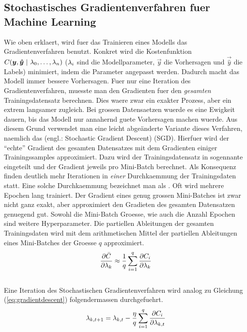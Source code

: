 \subsection{Stochastisches Gradientenverfahren fuer Machine Learning}
Wie oben erklaert, wird fuer das Trainieren eines Modells das Gradientenverfahren benutzt.
Konkret wird die Kostenfunktion $C(\vec{y},\vec{\hat{y}}\ |\ \param_0,\ldots,\param_n)$
($\lambda_i$ sind die Modellparameter, $\vec{y}$ die Vorhersagen und $\vec{\hat{y}}$
die Labels) minimiert, indem die Parameter angepasst werden. Dadurch macht das Modell immer bessere Vorhersagen.
Fuer nur eine Iteration des Gradientenverfahren, muesste man den Gradienten fuer den
\textit{gesamten} Trainingsdatensatz berechnen.
Dies waere zwar ein exakter Prozess, aber ein extrem langsamer zugleich.
Bei grossen Datensaetzen wuerde es eine Ewigkeit dauern, bis das Modell nur annahernd guete Vorhersagen machen wuerde.
\para{}
Aus diesem Grund verwendet man eine leicht abgeänderte Variante dieses
Verfahren, naemlich das  (engl.:
Stochastic Gradient Descent) (SGD).
Hierfuer wird der ``echte'' Gradient des gesamten Datensatzes mit dem Gradienten einiger Trainingssamples approximiert.
Dazu wird der Trainingsdatensatz in sogennante  eingeteilt und der Gradient jeweils pro Mini-Batch berechnet.
Als Konsequenz finden deutlich mehr Iterationen in \textit{einer}
Durchkaemmung der Trainingsdaten statt. Eine solche Durchkaemmung bezeichnet man als
. Oft wird mehrere Epochen lang trainiert.
Der Gradient eines genug grossen Mini-Batches ist zwar nicht ganz exakt, aber approximiert den Gradieten des gesamten Datensatzen genuegend gut.
Sowohl die Mini-Batch Groesse, wie auch die Anzahl Epochen sind weitere Hyperparameter.
\para{}
Die partiellen Ableitungen der gesamten Trainingsdaten wird mit dem
arithmetischen Mittel der partiellen Ableitungen eines Mini-Batches der Groesse $q$ approximiert.
\\
\begin{equation}\label{eq:minibatch_deriv}
  \frac{\partial \bar{C}}{\partial \lambda_k} \approx \frac{1}{q}\sum_{i=1}^{q} \frac{\partial C_i}{\partial \lambda_k}
\end{equation}
\\
Eine Iteration des Stochastischen Gradientenverfahren wird analog zu Gleichung (\ref{eq:gradientdescent}) folgendermassen durchgefuehrt.
\\
\begin{equation}\label{eq:sgd}
  \lambda_{k,t+1} = \lambda_{k,t} - \frac{\eta}{q} \sum_{i=1}^{q} \frac{\partial C_i}{\partial \lambda_{k,t}}
\end{equation}


